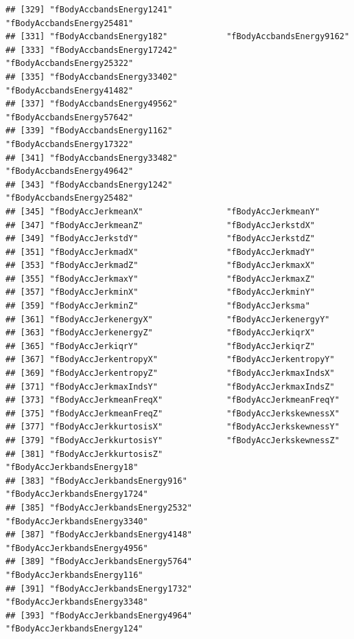 \documentclass[
]{article}
\begin{document}
\begin{verbatim}
## [329] "fBodyAccbandsEnergy1241"           "fBodyAccbandsEnergy25481"         
## [331] "fBodyAccbandsEnergy182"            "fBodyAccbandsEnergy9162"          
## [333] "fBodyAccbandsEnergy17242"          "fBodyAccbandsEnergy25322"         
## [335] "fBodyAccbandsEnergy33402"          "fBodyAccbandsEnergy41482"         
## [337] "fBodyAccbandsEnergy49562"          "fBodyAccbandsEnergy57642"         
## [339] "fBodyAccbandsEnergy1162"           "fBodyAccbandsEnergy17322"         
## [341] "fBodyAccbandsEnergy33482"          "fBodyAccbandsEnergy49642"         
## [343] "fBodyAccbandsEnergy1242"           "fBodyAccbandsEnergy25482"         
## [345] "fBodyAccJerkmeanX"                 "fBodyAccJerkmeanY"                
## [347] "fBodyAccJerkmeanZ"                 "fBodyAccJerkstdX"                 
## [349] "fBodyAccJerkstdY"                  "fBodyAccJerkstdZ"                 
## [351] "fBodyAccJerkmadX"                  "fBodyAccJerkmadY"                 
## [353] "fBodyAccJerkmadZ"                  "fBodyAccJerkmaxX"                 
## [355] "fBodyAccJerkmaxY"                  "fBodyAccJerkmaxZ"                 
## [357] "fBodyAccJerkminX"                  "fBodyAccJerkminY"                 
## [359] "fBodyAccJerkminZ"                  "fBodyAccJerksma"                  
## [361] "fBodyAccJerkenergyX"               "fBodyAccJerkenergyY"              
## [363] "fBodyAccJerkenergyZ"               "fBodyAccJerkiqrX"                 
## [365] "fBodyAccJerkiqrY"                  "fBodyAccJerkiqrZ"                 
## [367] "fBodyAccJerkentropyX"              "fBodyAccJerkentropyY"             
## [369] "fBodyAccJerkentropyZ"              "fBodyAccJerkmaxIndsX"             
## [371] "fBodyAccJerkmaxIndsY"              "fBodyAccJerkmaxIndsZ"             
## [373] "fBodyAccJerkmeanFreqX"             "fBodyAccJerkmeanFreqY"            
## [375] "fBodyAccJerkmeanFreqZ"             "fBodyAccJerkskewnessX"            
## [377] "fBodyAccJerkkurtosisX"             "fBodyAccJerkskewnessY"            
## [379] "fBodyAccJerkkurtosisY"             "fBodyAccJerkskewnessZ"            
## [381] "fBodyAccJerkkurtosisZ"             "fBodyAccJerkbandsEnergy18"        
## [383] "fBodyAccJerkbandsEnergy916"        "fBodyAccJerkbandsEnergy1724"      
## [385] "fBodyAccJerkbandsEnergy2532"       "fBodyAccJerkbandsEnergy3340"      
## [387] "fBodyAccJerkbandsEnergy4148"       "fBodyAccJerkbandsEnergy4956"      
## [389] "fBodyAccJerkbandsEnergy5764"       "fBodyAccJerkbandsEnergy116"       
## [391] "fBodyAccJerkbandsEnergy1732"       "fBodyAccJerkbandsEnergy3348"      
## [393] "fBodyAccJerkbandsEnergy4964"       "fBodyAccJerkbandsEnergy124"       

\end{verbatim}
\end{document}
